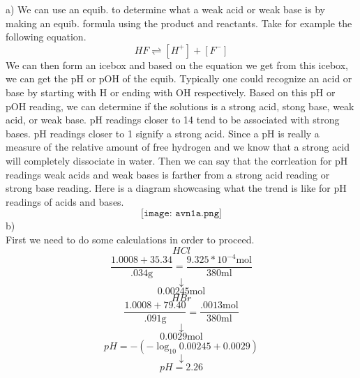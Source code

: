 \documentclass{article}
\begin{document}
    a) We can use an equib. to determine what a weak acid or weak base is by making an equib. formula using the product and reactants.
    Take for example the following equation.
    $$ HF \rightleftharpoons [H^{+}] + [F^{-}]$$
    We can then form an icebox and based on the equation we get from this icebox, we can get the
    pH or pOH of the equib. Typically one could recognize an acid or base by starting with H or ending with OH
    respectively. Based on this pH or pOH reading, we can determine if the solutions is a strong acid, stong base, weak acid, or weak base.
    pH readings closer to 14 tend to be associated with strong bases. pH readings closer to 1 signify a strong acid. Since a pH is really a measure of the relative amount of free hydrogen
    and we know that a strong acid will completely dissociate in water. Then we can say that the corrleation for pH readings weak acids and weak bases is farther from
    a strong acid reading or strong base reading. Here is a diagram showcasing what the trend is like for pH readings of acids and bases.
    $$ \texttt{[image: avn1a.png]}$$
    b)\\
    First we need to do some calculations in order to proceed.
    $$HCl$$
    $$\dfrac{1.0008 + 35.34}{.034 \si{\gram}} = \dfrac{9.325 * 10^{-4} \si{\mol}}{380 \si{\milli\litre}}$$
    $$\downarrow$$
    $$0.00245 \si{\mol}$$
    $$HBr$$
    $$\dfrac{1.0008 + 79.40}{.091 \si{\gram}} = \dfrac{.0013\si{\mol}}{380 \si{\milli\litre}}$$
    $$\downarrow$$
    $$0.0029 \si{\mol}$$
    $$pH = -(-\log_{10} 0.00245 + 0.0029) $$
    $$\downarrow$$
    $$pH = 2.26$$
\end{document}
